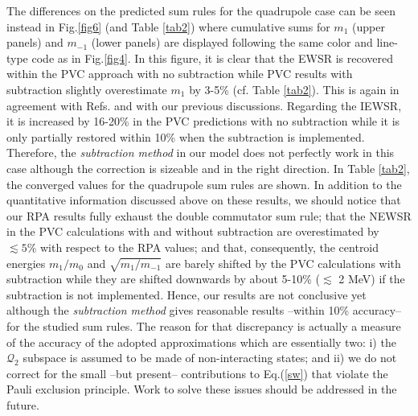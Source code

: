 \documentclass[12pt,a4paper,final]{iopart}
\begin{document}
The differences on the predicted sum rules for the quadrupole case can be seen instead in Fig.\ref{fig6} (and Table \ref{tab2}) where cumulative sums for $m_1$ (upper panels) and $m_{-1}$ (lower panels) are displayed following the same color and line-type code as in Fig.\ref{fig4}. In this figure, it is clear that the EWSR is recovered within the PVC approach with no subtraction while PVC results with subtraction slightly overestimate $m_1$ by 3-5\% (cf. Table \ref{tab2}). This is again in agreement with Refs.\cite{yannouleas1987,wambach1990} and with our previous discussions. Regarding the IEWSR, it is increased by 16-20\% in the PVC predictions with no subtraction while it is only partially restored within 10\% when the subtraction is implemented. Therefore, the {\it subtraction method} in our model does not perfectly work in this case although the correction is sizeable and in the right direction. In Table \ref{tab2}, the converged values for the quadrupole sum rules are shown. In addition to the quantitative information discussed above on these results, we should notice that our RPA results fully exhaust the double commutator sum rule; that the NEWSR in the PVC calculations with and without subtraction are overestimated by $\lesssim 5\%$ with respect to the RPA values; and that, consequently, the centroid energies $m_1/m_0$ and $\sqrt{m_1/m_{-1}}$ are barely shifted by the PVC calculations with subtraction while they are shifted downwards by about 5-10\% ($\lesssim$ 2 MeV) if the subtraction is not implemented. Hence, our results are not conclusive yet although the {\it subtraction method} gives reasonable results --within 10\% accuracy-- for the studied sum rules. The reason for that discrepancy is actually a measure of the accuracy of the adopted approximations which are essentially two:  i) the $\mathcal{Q}_2$ subspace is assumed to be made of non-interacting states; and ii) we do not correct for the small --but present-- contributions to Eq.(\ref{sw}) that violate the Pauli exclusion principle. Work to solve these issues should be addressed in the future.
\end{document}
